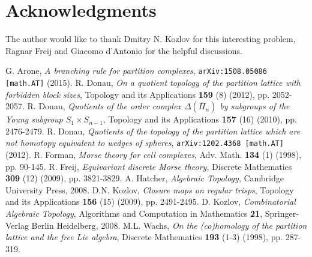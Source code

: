 \documentclass{elsarticle}
\begin{document}
\section*{Acknowledgments}
The author would like to thank Dmitry N. Kozlov for this interesting problem, Ragnar Freij and Giacomo d'Antonio for the helpful discussions.

\begin{thebibliography}{00}
G. Arone, \textit{A branching rule for partition complexes}, \texttt{arXiv:1508.05086 [math.AT]} (2015).
R. Donau, \textit{On a quotient topology of the partition lattice with forbidden block sizes}, Topology and its Applications \textbf{159} (8) (2012), pp. 2052-2057.
R. Donau, \textit{Quotients of the order complex $\Delta(\overline{\Pi}_n)$ by subgroups of the Young subgroup $S_1\times S_{n-1}$}, Topology and its Applications \textbf{157} (16) (2010), pp. 2476-2479.
R. Donau, \textit{Quotients of the topology of the partition lattice which are not homotopy equivalent to wedges of spheres}, \texttt{arXiv:1202.4368 [math.AT]} (2012).
R. Forman, \textit{Morse theory for cell complexes}, Adv. Math. \textbf{134} (1) (1998), pp. 90-145.
R. Freij, \textit{Equivariant discrete Morse theory}, Discrete Mathematics \textbf{309} (12) (2009), pp. 3821-3829.
A. Hatcher, \textit{Algebraic Topology}, Cambridge University Press, 2008.
D.N. Kozlov, \textit{Closure maps on regular trisps}, Topology and its Applications \textbf{156} (15) (2009), pp. 2491-2495.
D. Kozlov, \textit{Combinatorial Algebraic Topology}, Algorithms and Computation in Mathematics \textbf{21}, Springer-Verlag Berlin Heidelberg, 2008.
M.L. Wachs, \textit{On the (co)homology of the partition lattice and the free Lie algebra}, Discrete Mathematics \textbf{193} (1-3) (1998), pp. 287-319.
\end{thebibliography}
\end{document}
